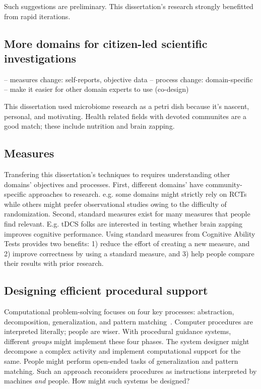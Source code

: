 Such suggestions are preliminary. This dissertation's research strongly benefitted from rapid iterations.

\subsection{More domains for citizen-led scientific investigations}
-- measures change: self-reports, objective data 
-- process change: domain-specific
-- make it easier for other domain experts to use (co-design)

This dissertation used microbiome research as a petri dish because it’s nascent, personal, and motivating. Health related fields with devoted communites are a good match; these include nutrition and brain zapping. 

\subsection{Measures}
Transfering this dissertation's techniques to requires understanding other domains' objectives and processes. First, different domains' have community-specific approaches to research. e.g. some domains might strictly rely on RCTs while others might prefer observational studies owing to the difficulty of randomization. Second, standard measures exist for many measures that people find relevant. E.g. tDCS folks are interested in testing whether brain zapping improves cognitive performance.  Using standard measures from Cognitive Ability Tests provides two benefits: 1) reduce the effort of creating a new measure, and 2) improve correctness by using a standard measure, and 3) help people compare their results with prior research.


\subsection{Designing efficient procedural support}
Computational problem-solving focuses on four key processes: abstraction, decomposition, generalization, and pattern matching~\cite{Wing2006}. Computer procedures are interpreted literally; people are wiser. With procedural guidance systems, different \textit{groups} might implement these four phases. The system designer might decompose a complex activity and implement computational support for the same. People might perform open-ended tasks of generalization and pattern matching. Such an approach reconsiders procedures as instructions interpreted by machines \textit{and} people. How might such systems be designed?

